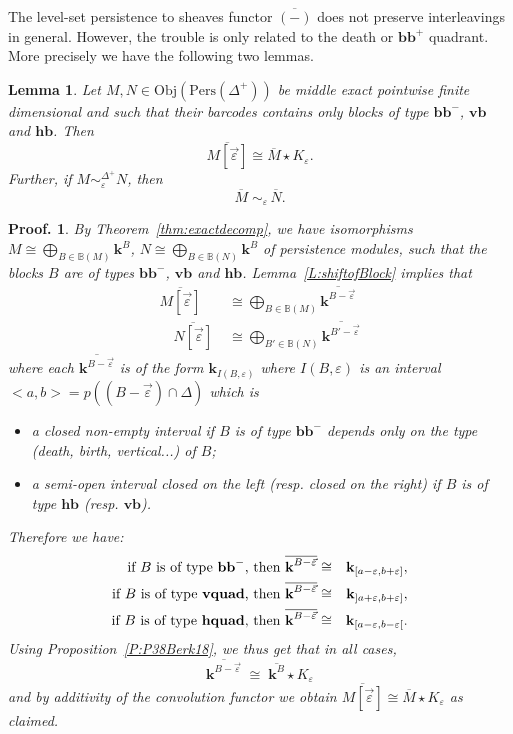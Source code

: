 \documentclass[a4paper, english, 11pt]{article}
\newcommand{\kk}[0]{\textbf{k}}
\newcommand{\Pe}{\text{Pers}}
\newcommand{\0}{\vec{0}}
\newcommand{\Obj}[0]{\text{Obj}}
\newtheorem*{pf}{Proof.} }
\newtheorem{lem}[prop]{Lemma}
\begin{document}
The level-set persistence to sheaves functor $\overline{(-)}$ does not preserve
interleavings in general. However, the trouble is only related to the death or $\textbf{bb}^+$ quadrant. More precisely we have the following two lemmas.
\begin{lem}\label{L:Barpreserveentre} Let $M, N\in \Obj(\Pe(\Delta^+))$ be middle exact  pointwise finite dimensional and such that their barcodes contains only blocks of type $\textbf{bb}^{-}$, $\textbf{vb}$ and $\textbf{hb}$. 
Then $$\overline{M [\vec{\varepsilon}]} \cong \overline{M}\star K_{\varepsilon}. $$ Further, 
if $M \sim_\varepsilon^{\Delta^+} N$, then 
 $$ \overline{M} \; \sim_\varepsilon \, \overline{N}.$$
\end{lem}
\begin{pf}
 By Theorem~\ref{thm:exactdecomp}, we have  isomorphisms 
 $M \cong\mathop{\bigoplus}\limits_{B\in \mathbb{B}(M)} \kk^B$, 
 $N \cong \mathop{\bigoplus}\limits_{B\in \mathbb{B}(N)} \kk^B$ of persistence modules, such that the blocks $B$ are of types $\textbf{bb}^{-}$, $\textbf{vb}$ and $\textbf{hb}$. Lemma~\ref{L:shiftofBlock} 
 implies that 
 \begin{align*}\overline{M[\vec{\varepsilon}]} &\;\cong \bigoplus_{B\in \mathbb{B}(M)} \overline{\kk^{B -\vec{\varepsilon}}}  \\ 
  \quad \overline{N[\vec{\varepsilon}]} &\;\cong \bigoplus_{B'\in \mathbb{B}(N)} \overline{\kk^{B' -\vec{\varepsilon}} }
  \end{align*}
 where each $\overline{\kk^{B -\vec{\varepsilon}}}$ is of the form 
 $\kk_{I(B, \varepsilon)}$ where $I(B, \varepsilon)$ is an interval $<a,b>=p((B-\vec{\varepsilon})\cap \Delta)$ which is
 \begin{itemize}\item a closed non-empty interval if $B$ is of type $\textbf{bb}^{-}$ depends only on the type (death, birth, vertical...) of $B$; 
  \item a semi-open interval closed on the left (resp. closed on the right) if  $B$ is of type $\textbf{hb}$ (resp. $\textbf{vb}$).
 \end{itemize}
Therefore we have: 
\begin{eqnarray*} 
 \text{if $B$ is of type $\textbf{bb}^{-}$, then }  \overline{\kk^{B-\vec{\varepsilon}}} 
 & \cong & \kk_{[a-\varepsilon, b+\varepsilon ]}, \\
 \text{if $B$ is of type \textbf{vquad}, then }  \overline{\kk^{B-\vec{\varepsilon}}} 
 & \cong & \kk_{]a+\varepsilon, b+\varepsilon ]}, \\
 \text{if $B$ is of type \textbf{hquad}, then }  \overline{\kk^{B-\vec{\varepsilon}}} 
 & \cong & \kk_{[a-\varepsilon, b-\varepsilon [}.
\end{eqnarray*}
 Using Proposition~\ref{P:P38Berk18}, we thus get that  in all cases, 
 $$ \overline{\kk^{B-\vec{\varepsilon}}} 
 \; \cong \;  \overline{\kk^B} \star K_\varepsilon $$ and by additivity of the convolution functor we obtain $\overline{M [\vec{\varepsilon}]} \cong \overline{M}\star K_{\varepsilon}$ as claimed.
 

\end{pf}
\end{document}
